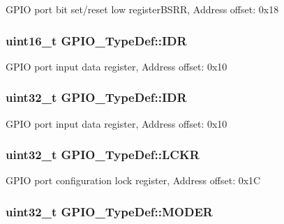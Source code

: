 G\-P\-I\-O port bit set/reset low register\-B\-S\-R\-R, Address offset\-: 0x18 \hypertarget{struct_g_p_i_o___type_def_a906a2c895ee5b66f35421e994c8a2b7c}{
\subsubsection[{I\-D\-R}]{ uint16\-\_\-t G\-P\-I\-O\-\_\-\-Type\-Def\-::\-I\-D\-R}}\label{struct_g_p_i_o___type_def_a906a2c895ee5b66f35421e994c8a2b7c}
G\-P\-I\-O port input data register, Address offset\-: 0x10 \hypertarget{struct_g_p_i_o___type_def_acf11156409414ad8841bb0b62959ee96}{
\subsubsection[{I\-D\-R}]{ uint32\-\_\-t G\-P\-I\-O\-\_\-\-Type\-Def\-::\-I\-D\-R}}\label{struct_g_p_i_o___type_def_acf11156409414ad8841bb0b62959ee96}
G\-P\-I\-O port input data register, Address offset\-: 0x10 \hypertarget{struct_g_p_i_o___type_def_a95a59d4b1d52be521f3246028be32f3e}{
\subsubsection[{L\-C\-K\-R}]{ uint32\-\_\-t G\-P\-I\-O\-\_\-\-Type\-Def\-::\-L\-C\-K\-R}}\label{struct_g_p_i_o___type_def_a95a59d4b1d52be521f3246028be32f3e}
G\-P\-I\-O port configuration lock register, Address offset\-: 0x1\-C \hypertarget{struct_g_p_i_o___type_def_ac2505d096b6b650f1647b8e0ff8b196b}{
\subsubsection[{M\-O\-D\-E\-R}]{ uint32\-\_\-t G\-P\-I\-O\-\_\-\-Type\-Def\-::\-M\-O\-D\-E\-R}}\label{struct_g_p_i_o___type_def_ac2505d096b6b650f1647b8e0ff8b196b}
